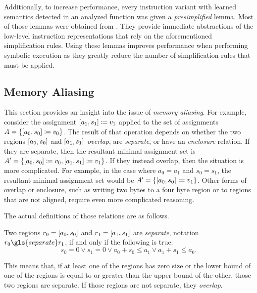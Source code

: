 Additionally, to increase performance,
every instruction variant with learned semantics detected in an analyzed function
was given a \emph{presimplified} lemma.%
Most of those lemmas were obtained from \autocite{verbeek2019refinement}.
They provide immediate abstractions of the low-level instruction representations
that rely on the aforementioned simplification rules.
Using these lemmas improves performance when performing symbolic execution
as they greatly reduce the number of simplification rules that must be applied.


\subsection{Memory Aliasing}\label{memory_aliasing}
This section provides an insight into the issue of \emph{memory aliasing}.%
For example, consider the assignment $[a_1,s_1]\coloneqq v_1$
applied to the set of assignments $A=\{[a_0,s_0]\coloneqq v_0\}$.
The result of that operation
depends on whether the two regions $[a_0,s_0]$ and $[a_1,s_1]$
\emph{overlap}, are \emph{separate}, or have an \emph{enclosure} relation.%
%
%
If they are separate, then the resultant minimal assignment set is
$A'=\{[a_0,s_0]\coloneqq v_0,[a_1,s_1]\coloneqq v_1\}$.
If they instead overlap, then the situation is more complicated.
For example, in the case where $a_0=a_1$ and $s_0=s_1$,
the resultant minimal assignment set would be $A'=\{[a_0,s_0]\coloneqq v_1\}$.
Other forms of overlap or enclosure, such as writing two bytes to a four byte region
or to regions that are not aligned, require even more complicated reasoning.

The actual definitions of those relations are as follows.
\begin{definition}[Separation]\label{def:sep}
  Two regions $r_0=[a_0,s_0]$ and $r_1=[a_1,s_1]$ are \emph{separate},%
  notation $r_0\gls{separate}r_1$, if and only if the following is true:
  \begin{equation*}
    s_0=0\lor s_1=0\lor a_0+s_0\leq a_1\lor a_1+s_1\leq a_0.
  \end{equation*}
\end{definition}
This means that, if at least one of the regions has zero size
or the lower bound of one of the regions is equal to or greater than
the upper bound of the other, those two regions are separate.
If those regions are not separate, they \emph{overlap}.

